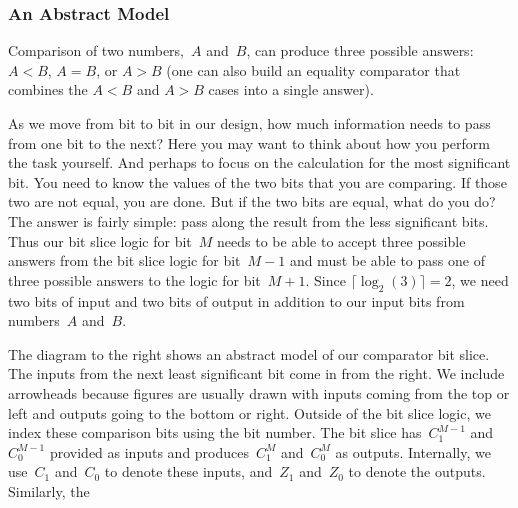 
\subsubsection{An Abstract Model}

Comparison of two numbers,~$A$ and~$B$, can produce three possible
answers: $A<B$, $A=B$, or $A>B$ (one can also build an equality
comparator that combines the $A<B$ and $A>B$ cases into a single 
answer).

As we move from bit to bit in our design, how much information needs 
to pass from one bit to the next?
%
Here you may want to think about how you perform the task yourself.
And perhaps to focus on the calculation for the most significant bit.
You need to know the values of the two bits that you are comparing.
If those two are not equal, you are done.
%
But if the two bits are equal, what do you do?
%
The answer is fairly simple: pass along the result
from the less significant bits.
%
Thus our bit slice logic for bit~$M$ needs to be able to accept 
three possible answers from the bit slice logic for bit~$M-1$ and must
be able to pass one of three possible answers to the logic for bit~$M+1$.
%
Since $\lceil\log_2(3)\rceil=2$, we need two bits of input and two bits
of output in addition to our input bits from numbers~$A$ and~$B$.

\begin{minipage}{4.4in}
The diagram to the right shows an abstract model of our 
comparator bit slice.  The inputs from the next least significant
bit come in from the right.  We include arrowheads because 
figures are usually drawn with inputs coming from the top or left 
and outputs going to the bottom or right.  Outside of the bit 
slice logic, we index
these comparison bits using the bit number.  The bit slice
has~$C_1^{M-1}$ and~$C_0^{M-1}$ provided as inputs and 
produces~$C_1^M$ and~$C_0^M$ as outputs.
%
Internally, we use~$C_1$ and~$C_0$ to denote these inputs,
and~$Z_1$ and~$Z_0$ to denote the outputs.
%
Similarly, the\linebreak
\end{minipage}\hspace{.25in}%
\begin{minipage}{1.85in}
\vspace{12pt}
\end{minipage}\mpdone

